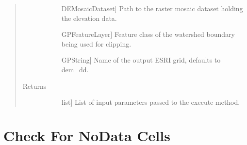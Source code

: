 \documentclass[letterpaper,10pt,english]{sphinxmanual}
\begin{document}
\begin{fulllineitems}
\begin{fulllineitems}
\begin{quote}
\begin{description}
\begin{description}
\item[{}] \leavevmode{[}DEMosaicDataset{]}
Path to the raster mosaic dataset holding the elevation data.

\item[{}] \leavevmode{[}GPFeatureLayer{]}
Feature class of the watershed boundary being used for clipping.

\item[{}] \leavevmode{[}GPString{]}
Name of the output ESRI grid, defaults to dem\_dd.

\end{description}

\item[{Returns}] \leavevmode\begin{description}
\item[{}] \leavevmode{[}list{]}
List of input parameters passed to the execute method.

\end{description}

\end{description}\end{quote}

\end{fulllineitems}


\end{fulllineitems}



\section{Check For NoData Cells}
\label{\detokenize{StreamStats_DataPrep:check-for-nodata-cells}}
\end{document}
